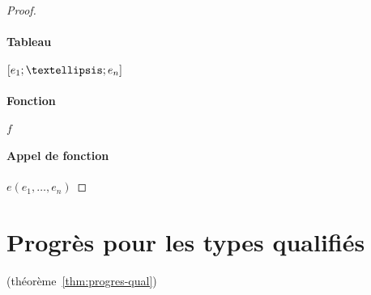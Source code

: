 \begin{proof}
\paragraph{ Tableau }               $ \eArray{e_1 ;…; e_n} $ %

\paragraph{ Fonction }              $ f $ %

\paragraph{ Appel de fonction }     $ e (e_1, …, e_n) $ %


\end{proof}

\section{Progrès pour les types qualifiés}
\label{proof:progres-qualif}

(théorème~\ref{thm:progres-qual})

